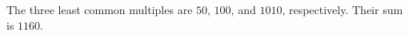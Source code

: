 The three least common multiples are $50$, $100$, and $1010$, respectively. Their sum is $\boxed{1160}$.

